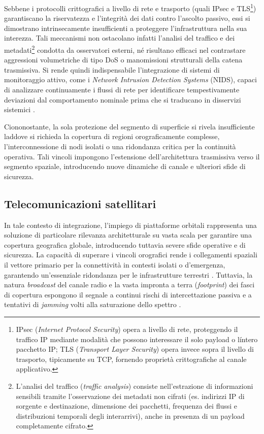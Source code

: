 Sebbene i protocolli crittografici a livello di rete e trasporto (quali IPsec e TLS\footnote{IPsec (\textit{Internet Protocol Security}) opera a livello di rete, proteggendo il traffico IP mediante modalità che possono interessare il solo payload o l\'intero pacchetto IP; TLS (\textit{Transport Layer Security}) opera invece sopra il livello di trasporto, tipicamente su TCP, fornendo proprietà crittografiche al canale applicativo.}) garantiscano la riservatezza e l'integrità dei dati contro l'ascolto passivo, essi si dimostrano intrinsecamente insufficienti a proteggere l'infrastruttura nella sua interezza. 
Tali meccanismi non ostacolano infatti l'analisi del traffico e dei metadati\footnote{L'analisi del traffico (\textit{traffic analysis}) consiste nell'estrazione di informazioni sensibili tramite l'osservazione dei metadati non cifrati (es. indirizzi IP di sorgente e destinazione, dimensione dei pacchetti, frequenza dei flussi e distribuzioni temporali degli interarrivi), anche in presenza di un payload completamente cifrato.} condotta da osservatori esterni, né risultano efficaci nel contrastare aggressioni volumetriche di tipo DoS o manomissioni strutturali della catena trasmissiva. 
Si rende quindi indispensabile l'integrazione di sistemi di monitoraggio attivo, come i \textit{Network Intrusion Detection Systems} (NIDS), capaci di analizzare continuamente i flussi di rete per identificare tempestivamente deviazioni dal comportamento nominale prima che si traducano in disservizi sistemici \cite{khraisat2019}.

Ciononostante, la sola protezione del segmento di superficie si rivela insufficiente laddove si richieda la copertura di regioni orograficamente complesse, l'interconnessione di nodi isolati o una ridondanza critica per la continuità operativa. 
Tali vincoli impongono l'estensione dell'architettura trasmissiva verso il segmento spaziale, introducendo nuove dinamiche di canale e ulteriori sfide di sicurezza.

\subsection{Telecomunicazioni satellitari}
\label{subsec:telecomunicazioni_satellitari}

In tale contesto di integrazione, l'impiego di piattaforme orbitali rappresenta una soluzione di particolare rilevanza architetturale su vasta scala per garantire una copertura geografica globale, introducendo tuttavia severe sfide operative e di sicurezza. 
La capacità di superare i vincoli orografici rende i collegamenti spaziali il vettore primario per la connettività in contesti isolati o d'emergenza, garantendo un'essenziale ridondanza per le infrastrutture terrestri \cite{kodheli2021}. 
Tuttavia, la natura \textit{broadcast} del canale radio e la vasta impronta a terra (\textit{footprint}) dei fasci di copertura espongono il segnale a continui rischi di intercettazione passiva e a tentativi di \textit{jamming} volti alla saturazione dello spettro \cite{nist2022}.


